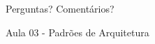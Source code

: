 \documentclass[
	9pt, %
	t, %
]{beamer}
\begin{document}
	





	






\begin{frame}[plain] %
	\begin{center}
		\bigskip\bigskip %
		
		{\Huge Perguntas? Comentários?}
		
		\bigskip\bigskip %
		
		{\LARGE Aula 03 - Padrões de Arquitetura}
	\end{center}
\end{frame}

\end{document}
